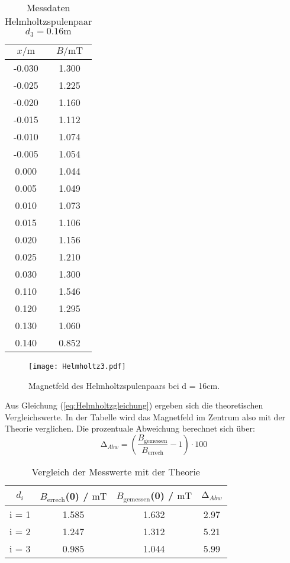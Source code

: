 \begin{table}
  \centering
  \caption{Messdaten Helmholtzspulenpaar $d_{3} = 0.16\unit\m$}
  \begin{tabular}{c c}
    \toprule
    $x / \unit\m$ &  $B / \unit{\milli\tesla}$ \\
    \midrule
    -0.030 &        1.300 \\
    -0.025 &        1.225 \\
    -0.020 &        1.160 \\
    -0.015 &        1.112 \\
    -0.010 &        1.074 \\
    -0.005 &        1.054 \\
     0.000 &        1.044 \\
     0.005 &        1.049 \\
     0.010 &        1.073 \\
     0.015 &        1.106 \\
     0.020 &        1.156 \\
     0.025 &        1.210 \\
     0.030 &        1.300 \\
     0.110 &        1.546 \\
     0.120 &        1.295 \\
     0.130 &        1.060 \\
     0.140 &        0.852 \\
    \bottomrule
  \end{tabular}
\end{table}

\begin{figure}
  \centering
  \texttt{[image: Helmholtz3.pdf]}
  \caption{Magnetfeld des Helmholtzspulenpaars bei d = 16cm.}
  \label{fig:Helmholtz3}
\end{figure}

Aus Gleichung (\ref{eq:Helmholtzgleichung}) ergeben sich die theoretischen Vergleichswerte.
In der Tabelle wird das Magnetfeld im Zentrum also mit der Theorie verglichen.
Die prozentuale Abweichung berechnet sich über:
\begin{equation}
  \increment_{Abw} = \left(\frac{B_{\text{gemessen}}}{B_{\text{errech}}} - 1\right) \cdot 100
\end{equation}

\begin{table}
  \centering
  \caption{Vergleich der Messwerte mit der Theorie}
  \begin{tabular}{c c c c }
    \toprule
    $d_{i}$ & $B_{\text{errech}}$(0) / $\unit{\milli\tesla}$ &  $B_{\text{gemessen}}$(0) / $\unit{\milli\tesla}$ & $\increment_{Abw}$\\
    \midrule
    i = 1  & 1.585 &         1.632  &     2.97 \\ 
    i = 2  & 1.247 &         1.312  &     5.21 \\ 
    i = 3  & 0.985 &         1.044  &     5.99 \\ 
    \bottomrule
  \end{tabular}
\end{table}

